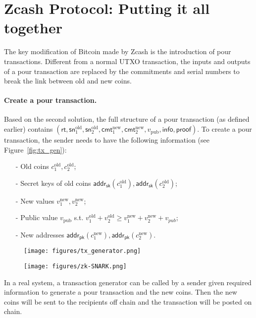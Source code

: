 \documentclass[a4paper]{article}
\newcommand{\cmt}{\textsf{cmt}}
\newcommand{\sn}{\textsf{sn}}
\newcommand{\adpk}{\textsf{addr}_{\textsf{pk}}}
\newcommand{\adsk}{\textsf{addr}_{\textsf{sk}}}
\newcommand{\rt}{\textsf{rt}}
\newcommand{\info}{\textsf{info}}
\newcommand{\pf}{\textsf{proof}}
\begin{document}
\section*{Zcash Protocol: Putting it all together}
The key  modification of Bitcoin made by Zcash  is the introduction of pour transactions. Different from a normal UTXO transaction, the inputs and outputs of a pour transaction are replaced by the commitments and serial numbers to break the link between old and new coins.

\paragraph{Create a pour transaction.} 
Based on the second solution, the full structure of a pour transaction (as  defined earlier) contains $(\rt, \sn_1^{\text{old}}, \sn_2^{\text{old}}, \cmt_1^{\text{new}}, \cmt_2^{\text{new}}, v_{\text{pub}}, \info, \pf)$. To create a pour transaction, the sender needs to have the following information (see Figure~\ref{fig:tx_gen}):
\begin{itemize}
    \item [-] Old coins $c_1^{\text{old}}, c_2^{\text{old}}$;
    \item [-] Secret keys of old coins $\adsk(c_1^{\text{old}}), \adsk(c_2^{\text{old}})$;
    \item [-] New values $v_1^{\text{new}}, v_2^{\text{new}}$; 
    \item [-] Public value $v_{\text{pub}}$ s.t. $v_1^{\text{old}} + v_2^{\text{old}} \ge v_1^{\text{new}} + v_2^{\text{new}} + v_{pub}$;
    \item [-] New addresses $\adpk(c_1^{\text{new}}), \adpk(c_2^{\text{new}})$.
\end{itemize}

\begin{figure}
\centering
\begin{minipage}{.5\textwidth}
  \centering
  \texttt{[image: figures/tx\_generator.png]}
  \label{fig:tx_gen}
\end{minipage}%
\begin{minipage}{.5\textwidth}
  \centering
  \texttt{[image: figures/zk-SNARK.png]}
  \label{fig:proof_gen}
\end{minipage}
\end{figure}
In a real system, a transaction generator can be called by a sender given required information to generate a pour transaction and the new coins. Then the new coins will be sent to the recipients off chain and the transaction will be posted on chain.  
\end{document}
